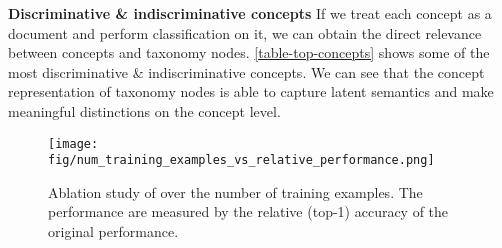 \begin{table}
\centering

\vspace{3pt}
\caption{Example discriminative vs indiscriminative concepts discovered in each dataset}
\vspace{-10pt}
\label{table-top-concepts}
\end{table}


\noindent \textbf{Discriminative \& indiscriminative concepts}
If we treat each concept as a document and perform classification on it, we can obtain the direct relevance between concepts and taxonomy nodes. \autoref{table-top-concepts}
shows some of the most discriminative \& indiscriminative concepts. We can see that the concept representation of taxonomy nodes is able to capture latent semantics and make meaningful distinctions on the concept level.


\begin{figure}[]
\centering
\texttt{[image: fig/num\_training\_examples\_vs\_relative\_performance.png]}
\vspace{10pt}
\caption{Ablation study of \Hiercon over the number of training examples. The performance are measured by the relative (top-1) accuracy of the original performance.}
\label{fig-num-training-example}
\vspace{-3pt}
\end{figure}


